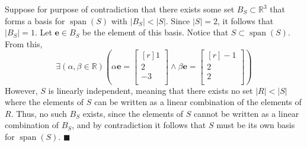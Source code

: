 \documentclass{article}
\begin{document}
Suppose for purpose of contradiction that there exists some set \(B_S \subset \mathbb{R} ^3\) that forms a basis for \(\operatorname{span}(S) \) with \(\left\vert B_S \right\vert < |S| \). Since \(|S| =2\), it follows that \(\left\vert B_S \right\vert =1 \). Let \(\mathbf{e} \in B_S\) be the element of this basis. Notice that \(S \subset \operatorname{span}(S) \). From this,
\[
  \exists (\alpha,\beta  \in\mathbb{R} )\left( \alpha \mathbf{e} =\begin{bmatrix}[r]
     1 \\
     2 \\
     -3 \\
  \end{bmatrix} \land \beta \mathbf{e} =\begin{bmatrix}[r]
     -1 \\
      2\\
      2\\
  \end{bmatrix} \right) 
\]
However, \(S\) is linearly independent, meaning that there exists no set \(\left\vert R \right\vert < |S| \) where the elements of \(S\) can be written as a linear combination of the elements of \(R\). Thus, no such \(B_S\) exists, since the elements of \(S\) cannot be written as a linear combination of \(B_S\), and by contradiction it follows that \(S\) must be its own basis for \(\operatorname{span}(S) \).
\hfill\(\blacksquare\)
\end{document}
